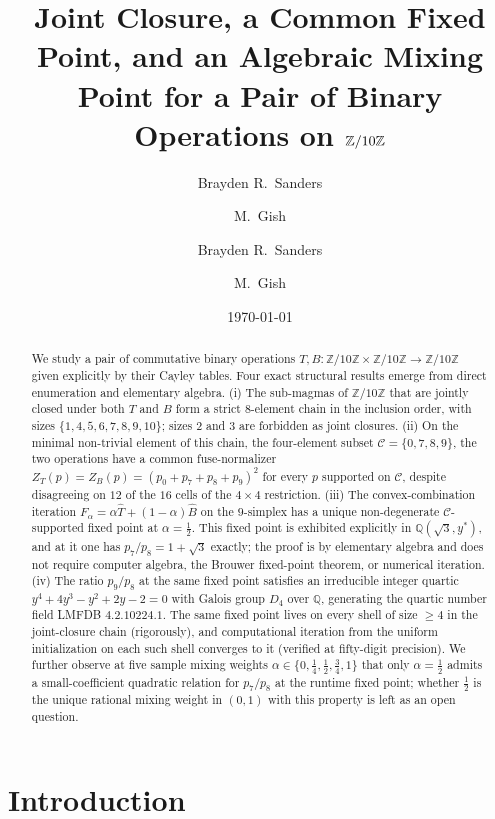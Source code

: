 \documentclass[11pt,reqno]{amsart}
\title[Joint Closure on $\Zten$]{Joint Closure, a Common Fixed Point, and an Algebraic
Mixing Point for a Pair of Binary Operations on $\Zten$}
\author{Brayden R.\ Sanders \and M.\ Gish}
\author{Brayden R.\ Sanders \and M.\ Gish}
\date{\today}
\theoremstyle{plain}
\theoremstyle{definition}
\theoremstyle{remark}
\newcommand{\Z}{\mathbb{Z}}
\newcommand{\Q}{\mathbb{Q}}
\newcommand{\Zten}{\Z/10\Z}
\newcommand{\Cfour}{\mathcal{C}}
\newcommand{\Tfuse}{\widehat{T}}
\newcommand{\Bfuse}{\widehat{B}}
\newcommand{\Fmix}{F_{\alpha}}
\begin{document}
\begin{abstract}
We study a pair of commutative binary operations
$T,B:\Zten\times\Zten\to\Zten$ given explicitly by their Cayley
tables. Four exact structural results emerge from direct
enumeration and elementary algebra. (i) The sub-magmas of $\Zten$
that are jointly closed under both $T$ and $B$ form a strict
$8$-element chain in the inclusion order, with sizes
$\{1,4,5,6,7,8,9,10\}$; sizes $2$ and $3$ are forbidden as joint
closures. (ii) On the minimal non-trivial element of this
chain, the four-element subset $\Cfour=\{0,7,8,9\}$, the two
operations have a common fuse-normalizer
$Z_{T}(p)=Z_{B}(p)=(p_{0}+p_{7}+p_{8}+p_{9})^{2}$ for every $p$
supported on $\Cfour$, despite disagreeing on $12$ of the $16$
cells of the $4\times 4$ restriction. (iii) The convex-combination
iteration $\Fmix=\alpha\Tfuse+(1-\alpha)\Bfuse$ on the $9$-simplex
has a unique non-degenerate $\Cfour$-supported fixed point at
$\alpha=\tfrac12$. This fixed point is exhibited explicitly in
$\Q(\sqrt{3},y^{*})$, and at it one has
$p_{7}/p_{8}=1+\sqrt{3}$ exactly;
the proof is by elementary algebra and does not require computer
algebra, the Brouwer fixed-point theorem, or numerical iteration.
(iv) The ratio $p_{9}/p_{8}$ at the same fixed point satisfies an
irreducible integer quartic $y^{4}+4y^{3}-y^{2}+2y-2=0$ with
Galois group $D_{4}$ over $\Q$, generating the quartic number
field LMFDB \textnumero $4.2.10224.1$. The same fixed point lives
on every shell of size $\geq 4$ in the joint-closure chain
(rigorously), and computational iteration from the uniform
initialization on each such shell converges to it (verified at
fifty-digit precision). We further
observe at five sample mixing weights
$\alpha\in\{0,\tfrac14,\tfrac12,\tfrac34,1\}$ that only
$\alpha=\tfrac12$ admits a small-coefficient quadratic relation
for $p_{7}/p_{8}$ at the runtime fixed point; whether $\tfrac12$
is the unique rational mixing weight in $(0,1)$ with this property
is left as an open question.
\end{abstract}

\maketitle

\section{Introduction}\label{sec:intro}
\end{document}
